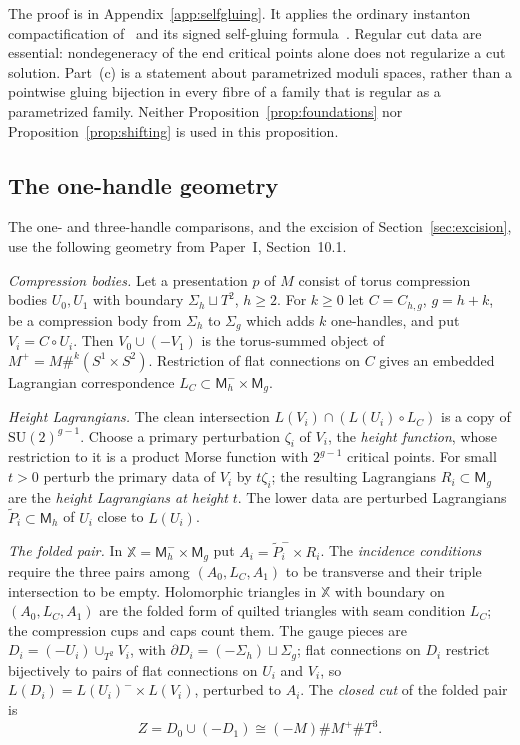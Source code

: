 \documentclass[11pt]{amsart}
\theoremstyle{definition}
\theoremstyle{remark}
\theoremstyle{plain}
\numberwithin{equation}{section}
\newcommand{\SU}{\mathrm{SU}}
\newcommand{\Msf}{\mathsf M}
\begin{document}
The proof is in Appendix~\ref{app:selfgluing}. It applies the
ordinary instanton compactification of~\cite[Section~3.9]{KM-unknot}
and its signed self-gluing formula~\cite[Proposition~5.5]{KM-unknot}.
Regular cut data are essential: nondegeneracy of the end critical
points alone does not regularize a cut solution. Part~(c) is a
statement about parametrized moduli spaces, rather than a pointwise
gluing bijection in every fibre of a family that is regular as a parametrized family.
Neither Proposition~\ref{prop:foundations} nor
Proposition~\ref{prop:shifting} is used in this
proposition.

\subsection{The one-handle geometry}\label{subsec:handle-geometry}
The one- and three-handle comparisons, and the excision of Section~\ref{sec:excision}, use the
following geometry from Paper~I, Section~10.1.

\emph{Compression bodies.} Let a presentation $p$ of $M$ consist of torus compression bodies
$U_0,U_1$ with boundary $\Sigma_h\sqcup T^2$, $h\ge2$. For $k\ge0$ let $C=C_{h,g}$, $g=h+k$, be a
compression body from $\Sigma_h$ to $\Sigma_g$ which adds $k$ one-handles, and put $V_i=C\circ U_i$.
Then $V_0\cup(-V_1)$ is the torus-summed object of $M^+=M\#^k(S^1\times S^2)$. Restriction of flat
connections on $C$ gives an embedded Lagrangian correspondence $L_C\subset\Msf_h^-\times\Msf_g$.

\emph{Height Lagrangians.} The clean intersection $L(V_i)\cap(L(U_i)\circ L_C)$ is a copy of
$\SU(2)^{g-1}$. Choose a primary perturbation $\zeta_i$ of $V_i$, the \emph{height function}, whose restriction to it is a product Morse function with $2^{g-1}$ critical points. For small $t>0$ perturb the primary data of $V_i$ by $t\zeta_i$; the
resulting Lagrangians $R_i\subset\Msf_g$ are the \emph{height Lagrangians at height} $t$. The lower
data are perturbed Lagrangians $\widetilde P_i\subset\Msf_h$ of $U_i$ close to $L(U_i)$.

\emph{The folded pair.} In $\mathbb X=\Msf_h^-\times\Msf_g$ put $A_i=\widetilde P_i^-\times R_i$. The
\emph{incidence conditions} require the three pairs among $(A_0,L_C,A_1)$ to be transverse and their
triple intersection to be empty. Holomorphic triangles in $\mathbb X$ with boundary on
$(A_0,L_C,A_1)$ are the folded form of quilted triangles with seam condition $L_C$; the compression
cups and caps count them. The gauge pieces are $D_i=(-U_i)\cup_{T^2}V_i$, with
$\partial D_i=(-\Sigma_h)\sqcup\Sigma_g$; flat connections on $D_i$ restrict bijectively to pairs of
flat connections on $U_i$ and $V_i$, so $L(D_i)=L(U_i)^-\times L(V_i)$, perturbed to $A_i$. The
\emph{closed cut} of the folded pair is
\[
 Z=D_0\cup(-D_1)\cong(-M)\#M^+\#T^3 .
\]
\end{document}
